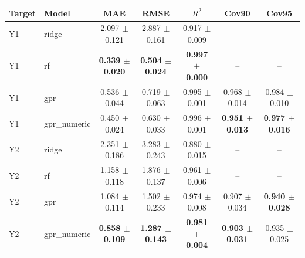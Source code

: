 \begin{tabular}{llccccc}
\toprule
\textbf{Target} & \textbf{Model} & \textbf{MAE} & \textbf{RMSE} & \textbf{$R^2$} & \textbf{Cov90} & \textbf{Cov95} \\
\midrule
Y1 & ridge & 2.097 $\pm$ 0.121 & 2.887 $\pm$ 0.161 & 0.917 $\pm$ 0.009 & -- & -- \\
Y1 & rf & \textbf{0.339 $\pm$ 0.020} & \textbf{0.504 $\pm$ 0.024} & \textbf{0.997 $\pm$ 0.000} & -- & -- \\
Y1 & gpr & 0.536 $\pm$ 0.044 & 0.719 $\pm$ 0.063 & 0.995 $\pm$ 0.001 & 0.968 $\pm$ 0.014 & 0.984 $\pm$ 0.010 \\
Y1 & gpr\_numeric & 0.450 $\pm$ 0.024 & 0.630 $\pm$ 0.033 & 0.996 $\pm$ 0.001 & \textbf{0.951 $\pm$ 0.013} & \textbf{0.977 $\pm$ 0.016} \\
Y2 & ridge & 2.351 $\pm$ 0.186 & 3.283 $\pm$ 0.243 & 0.880 $\pm$ 0.015 & -- & -- \\
Y2 & rf & 1.158 $\pm$ 0.118 & 1.876 $\pm$ 0.137 & 0.961 $\pm$ 0.006 & -- & -- \\
Y2 & gpr & 1.084 $\pm$ 0.114 & 1.502 $\pm$ 0.233 & 0.974 $\pm$ 0.008 & 0.907 $\pm$ 0.034 & \textbf{0.940 $\pm$ 0.028} \\
Y2 & gpr\_numeric & \textbf{0.858 $\pm$ 0.109} & \textbf{1.287 $\pm$ 0.143} & \textbf{0.981 $\pm$ 0.004} & \textbf{0.903 $\pm$ 0.031} & 0.935 $\pm$ 0.025 \\
\bottomrule
\end{tabular}